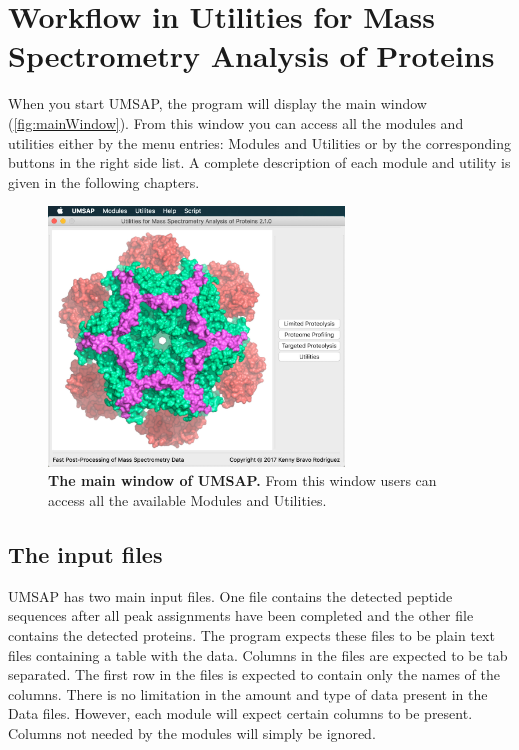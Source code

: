 \chapter{Workflow in Utilities for Mass Spectrometry Analysis of Proteins}
\label{chap:workflow}

When you start UMSAP, the program will display the main window (\autoref{fig:mainWindow}). From this window you can access all the modules and utilities either by the menu entries: Modules and Utilities or by the corresponding buttons in the right side list. A complete description of each module and utility is given in the following chapters.

\begin{figure}[h]
	\centering
	\includegraphics[width=0.7\textwidth]{./IMAGES/MAIN-WINDOW/mainwindow.jpg}	    
	\caption[The main window of UMSAP]{\textbf{The main window of UMSAP.} From this window users can access all the available Modules and Utilities.} 
	\label{fig:mainWindow}
	\vspace{-5pt} 	
\end{figure}  

\section{The input files}
\label{sec:dataFile}

UMSAP has two main input files. One file contains the detected peptide sequences after all peak assignments have been completed and the other file contains the detected proteins. The program expects these files to be plain text files containing a table with the data. Columns in the files are expected to be tab separated. The first row in the files is expected to contain only the names of the columns. There is no limitation in the amount and type of data present in the Data files. However, each module will expect certain columns to be present. Columns not needed by the modules will simply be ignored.

